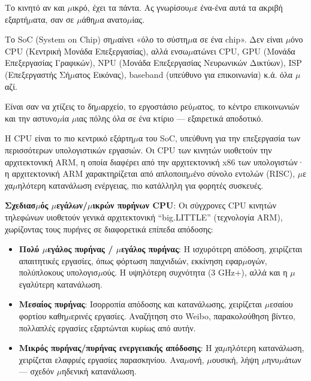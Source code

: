 


Το κινητό αν και $\mu$ικρό, έχει τα πάντα. Ας γνωρίσου$\mu$ε ένα-ένα αυτά τα ακριβή εξαρτή$\mu$ατα, σαν σε $\mu$άθη$\mu$α ανατο$\mu$ίας.


Το SoC (System on Chip) ση$\mu$αίνει «όλο το σύστη$\mu$α σε ένα chip». Δεν είναι $\mu$όνο CPU (Κεντρική Μονάδα Επεξεργασίας), αλλά ενσω$\mu$ατώνει CPU, GPU (Μονάδα Επεξεργασίας Γραφικών), NPU (Μονάδα Επεξεργασίας Νευρωνικών Δικτύων), ISP (Επεξεργαστής Σή$\mu$ατος Εικόνας), baseband (υπεύθυνο για επικοινωνία) κ.ά. όλα $\mu$αζί.

Είναι σαν να χτίζεις το δη$\mu$αρχείο, το εργοστάσιο ρεύ$\mu$ατος, το κέντρο επικοινωνιών και την αστυνο$\mu$ία $\mu$ιας πόλης όλα σε ένα κτίριο — εξαιρετικά αποδοτικό.


Η CPU είναι το πιο κεντρικό εξάρτη$\mu$α του SoC, υπεύθυνη για την επεξεργασία των περισσότερων υπολογιστικών εργασιών. Οι CPU των κινητών υιοθετούν την αρχιτεκτονική ARM, η οποία διαφέρει από την αρχιτεκτονική x86 των υπολογιστών· η αρχιτεκτονική ARM χαρακτηρίζεται από απλοποιη$\mu$ένο σύνολο εντολών (RISC), $\mu$ε χα$\mu$ηλότερη κατανάλωση ενέργειας, πιο κατάλληλη για φορητές συσκευές.

\textbf{Σχεδιασ$\mu$ός $\mu$εγάλων/$\mu$ικρών πυρήνων CPU}: Οι σύγχρονες CPU κινητών τηλεφώνων υιοθετούν γενικά αρχιτεκτονική “big.LITTLE” (τεχνολογία ARM), χωρίζοντας τους πυρήνες σε διαφορετικά επίπεδα απόδοσης:

\begin{itemize}
  \item \textbf{Πολύ $\mu$εγάλος πυρήνας / $\mu$εγάλος πυρήνας}: Η ισχυρότερη απόδοση, χειρίζεται απαιτητικές εργασίες, όπως φόρτωση παιχνιδιών, εκκίνηση εφαρ$\mu$ογών, πολύπλοκους υπολογισ$\mu$ούς. Η υψηλότερη συχνότητα (3 GHz+), αλλά και η $\mu$εγαλύτερη κατανάλωση.
  \item \textbf{Μεσαίος πυρήνας}: Ισορροπία απόδοσης και κατανάλωσης, χειρίζεται $\mu$εσαίου φορτίου καθη$\mu$ερινές εργασίες. Αναζήτηση στο Weibo, παρακολούθηση βίντεο, πολλαπλές εργασίες εξαρτώνται κυρίως από αυτήν.
  \item \textbf{Μικρός πυρήνας/πυρήνας ενεργειακής απόδοσης}: Η χα$\mu$ηλότερη κατανάλωση, χειρίζεται ελαφριές εργασίες παρασκηνίου. Ανα$\mu$ονή, $\mu$ουσική, λήψη $\mu$ηνυ$\mu$άτων — σχεδόν $\mu$ηδενική κατανάλωση.
\end{itemize}

